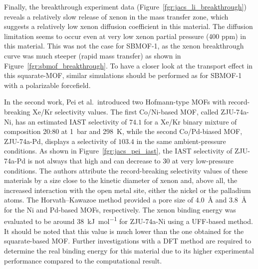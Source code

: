 \documentclass[main]{subfiles}
\begin{document}
Finally, the breakthrough experiment data (Figure~\ref{fgr:jacs_li_breakthrough}) reveals a relatively slow release of xenon in the mass transfer zone, which suggests a relatively low xenon diffusion coefficient in this material. The diffusion limitation seems to occur even at very low xenon partial pressure (400 ppm) in this material. This was not the case for SBMOF-1, as the xenon breakthrough curve was much steeper (rapid mass transfer) as shown in Figure~\ref{fgr:sbmof_breakthrough}. To have a closer look at the transport effect in this squarate-MOF, similar simulations should be performed as for SBMOF-1 with a polarizable forcefield.

In the second work,\autocite{Pei_2022} Pei et al.\ introduced two Hofmann-type MOFs with record-breaking Xe/Kr selectivity values. The first Co/Ni-based MOF, called ZJU-74a-Ni, has an estimated IAST selectivity of $74.1$ for a Xe/Kr binary mixture of composition 20:80 at \SI{1}{\bar} and \SI{298}{\kelvin}, while the second Co/Pd-biased MOF, ZJU-74a-Pd, displays a selectivity of $103.4$ in the same ambient-pressure conditions. As shown in Figure~\ref{fgr:jacs_pei_iast}, the IAST selectivity of ZJU-74a-Pd is not always that high and can decrease to $30$ at very low-pressure conditions. The authors attribute the record-breaking selectivity values of these materials by a size close to the kinetic diameter of xenon and, above all, the increased interaction with the open metal site, either the nickel or the palladium atoms. The Horvath–Kawazoe method provided a pore size of \SI{4.0}{\angstrom} and \SI{3.8}{\angstrom} for the Ni and Pd-based MOFs, respectively. The xenon binding energy was evaluated to be around \SI{38}{\kJ\per\mole} for ZJU-74a-Ni using a UFF-based method. It should be noted that this value is much lower than the one obtained for the squarate-based MOF. Further investigations with a DFT method are required to determine the real binding energy for this material due to its higher experimental performance compared to the computational result. 
\end{document}

